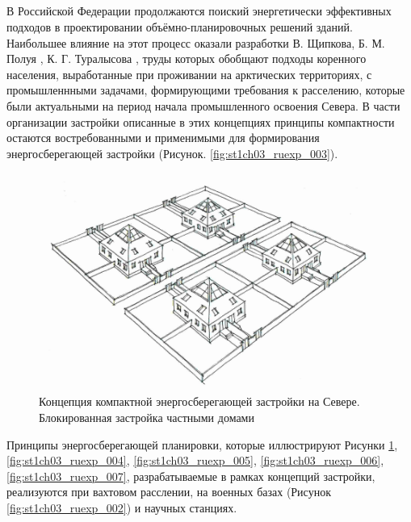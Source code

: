 \subsection{\scAssesmentExp}
% 
В Российской Федерации продолжаются поиский энергетически эффективных подходов в проектировании объёмно-планировочных решений зданий.
Наибольшее влияние на этот процесс оказали разработки В. Щипкова, Б. М. Полуя \cite{1989up_Poluyi_ArchGradoVsurovomKlimate}, К. Г. Туралысова \cite{1996up_Turalysov_BiospherRasseleniye},
труды которых обобщают подходы коренного населения, выработанные при проживании на арктических территориях,
с промышленнными задачами, формирующими требования к расселению, которые были актуальными на период начала промышленного освоения Севера.
В части организации застройки описанные в этих концепциях принципы компактности остаются востребованными и применимыми для формирования энергосберегающей застройки (Рисунок. \ref{fig:st1ch03_ruexp_003}).
\clearpage
\begin{figure}
    \centering
    \includegraphics[width=\textwidth]{assets/figures/st1ch03_ruexp_001.png}
    \caption{Концепция компактной энергосберегающей застройки на Севере. Блокированная застройка частными домами}
    \label{fig:st1ch03_ruexp_001}
  \end{figure}


Принципы энергосберегающей планировки, которые иллюстрируют Рисунки \ref{fig:st1ch03_ruexp_001}, \ref{fig:st1ch03_ruexp_004}, \ref{fig:st1ch03_ruexp_005}, \ref{fig:st1ch03_ruexp_006}, \ref{fig:st1ch03_ruexp_007},
разрабатываемые в рамках концепций застройки, реализуются при вахтовом расслении, на военных базах (Рисунок \ref{fig:st1ch03_ruexp_002}) и научных станциях.


